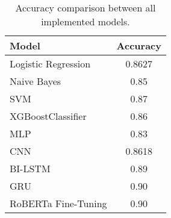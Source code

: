 \begin{table}[H]
\centering
\begin{tabular}{l c}
\toprule
\textbf{Model} & \textbf{Accuracy} \\
\midrule
Logistic Regression     & 0.8627 \\
Naive Bayes             & 0.85 \\
SVM                     & 0.87 \\
XGBoostClassifier       & 0.86 \\
MLP                     & 0.83 \\
CNN                     & 0.8618 \\
BI-LSTM                 & 0.89 \\
GRU                     & 0.90 \\
RoBERTa Fine-Tuning     & 0.90 \\
\bottomrule
\end{tabular}
\caption{Accuracy comparison between all implemented models.}
\label{tab:model_accuracy_comparison}
\end{table}